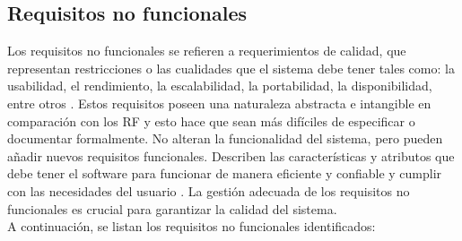 \subsection{Requisitos no funcionales}

Los requisitos no funcionales se refieren a requerimientos de calidad, que representan restricciones o las cualidades que el sistema debe tener tales como: la usabilidad, el rendimiento, la escalabilidad, la portabilidad, la disponibilidad, entre otros \cite{sommerville2011software}. Estos requisitos poseen una naturaleza abstracta e intangible en comparación con los RF y esto hace que sean más difíciles de especificar o documentar formalmente. No alteran la funcionalidad del sistema, pero pueden añadir nuevos requisitos funcionales. Describen las características y atributos que debe tener el software para funcionar de manera eficiente y confiable y cumplir con las necesidades del usuario \cite{molina2019requisitos}.
La gestión adecuada de los requisitos no funcionales es crucial para garantizar la calidad del sistema.\\

A continuación, se listan los requisitos no funcionales identificados:

